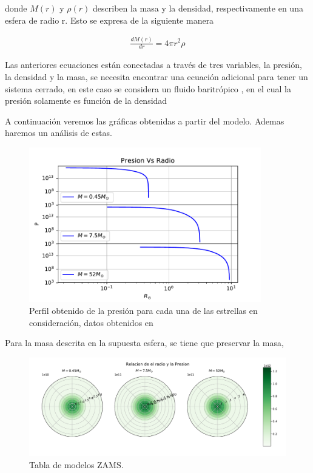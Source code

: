\documentclass[12pt]{article}
\begin{document}
donde $M(r)$ y $\rho(r)$ describen la masa y la densidad, respectivamente en una esfera de radio r. Esto se expresa de la siguiente manera

\begin{eqnarray}
	\frac{dM(r)}{dr} = 4\pi r^2 \rho
\end{eqnarray}

Las anteriores ecuaciones están conectadas a través de tres variables, la presión, la densidad y la masa, se necesita encontrar una ecuación adicional para tener un sistema cerrado, en este caso se considera un fluido baritrópico , en el cual la presión solamente es función de la densidad




A continuación veremos las gráficas obtenidas a partir del modelo. Ademas  haremos un análisis de estas. 

\begin{figure}[H]
    \centering   
    \includegraphics[width=0.9\textwidth]{Presion_graficas.pdf}
    \caption{Perfil obtenido de la presión para cada una de las estrellas en consideración, datos obtenidos en }
    \label{fig:zams}
\end{figure}


Para la masa descrita en la supuesta esfera, se tiene que preservar la masa, 

\newpage


\begin{figure}[H]
    \centering   
    \includegraphics[width=1.0\textwidth]{Polar_presion.pdf}
    \caption{Tabla de modelos ZAMS.}
    \label{fig:zams}
\end{figure}
\end{document}

